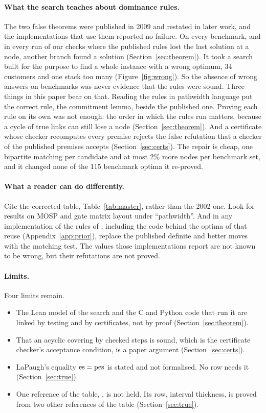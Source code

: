 \paragraph{What the search teaches about dominance rules.} The two false
theorems were published in 2009 and restated in later work, and the
implementations that use them reported no failure. On every benchmark, and in
every run of our checks where the published rules lost the last solution at a
node, another branch found a solution (Section~\ref{sec:theorem}). It took a
search built for the purpose to find a whole instance with a wrong optimum,
34 customers and one stack too many (Figure~\ref{fig:wrong}). So the absence of
wrong answers on benchmarks was never evidence that the rules were sound. Three things in this paper bear on that. Reading the rules in pathwidth language put the correct rule, the
commitment lemma, beside the published one. Proving each rule on its own was
not enough: the order in which the rules run matters, because a cycle of true
links can still lose a node (Section~\ref{sec:theorem}). And a certificate
whose checker recomputes every premise rejects the false refutation that a
checker of the published premises accepts (Section~\ref{sec:certs}). The repair
is cheap, one bipartite matching per candidate and at most 2\% more nodes per
benchmark set, and it changed none of the 115
benchmark optima it re-proved.

\paragraph{What a reader can do differently.} Cite the corrected table,
Table~\ref{tab:master}, rather than the 2002 one. Look for results on MOSP and
gate matrix layout under ``pathwidth''. And in any implementation of the rules
of \citet{ChuStuckey2009}, including the code behind the optima of
\citet{Frinhani2018} that \citet{MartinYanassePinto2022} reuse
(Appendix~\ref{app:prior}), replace the published definite and better moves
with the matching test. The values those implementations report are not known
to be wrong, but their refutations are not proved.

\paragraph{Limits.} Four limits remain.
\begin{itemize}
\item The Lean model of the search and the C and Python code that run it are
  linked by testing and by certificates, not by proof
  (Section~\ref{sec:theorem}).
\item That an acyclic covering by checked steps is sound, which is the
  certificate checker's acceptance condition, is a paper argument
  (Section~\ref{sec:certs}).
\item LaPaugh's equality $\mathrm{es}=\mathrm{pes}$ is stated and not formalised. No row
  needs it (Section~\ref{sec:true}).
\item One reference of the table, \citet{LY2002ref5}, is not held. Its row,
  interval thickness, is proved from two other
  references of the table
  (Section~\ref{sec:true}).
\end{itemize}

